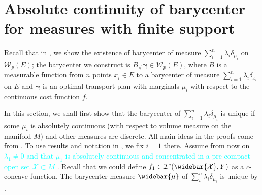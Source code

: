 \section{Absolute continuity of barycenter for measures with finite support}

\label{section:absolute_continuity_finite_support}
Recall that in ,
we show the existence of barycenter of measure $\sum_{i=1}^{n} \lambda_i \delta_{\mu_i}$ on $\mathcal{W}_p(E)$;
the barycenter we construct is $B_{\#}\boldsymbol{\gamma} \in \mathcal{W}_p(E)$,
where $B$ is a measurable function from $n$ points $x_i \in E$ to a barycenter of
measure $\sum_{i=1}^{n} \lambda_i \delta_{x_i}$ on $E$
and $\boldsymbol{\gamma}$ is an optimal transport plan
with marginals $\mu_i$ with respect to the continuous cost function $f$.

In this section, we shall first show that
the barycenter of $\sum_{i=1}^n \lambda_i \delta_{\mu_i}$
is unique if some $\mu_i$
is absolutely continuous (with respect to volume measure on the manifold $M$)
and other measures are discrete.
All main ideas in the proofs come from \cite{KIM2017640}.
To use results and notation in ,
we fix $i = 1$ there.
Assume from now on \textcolor{cyan}{
	$ \lambda_1 \neq 0$ and that $\mu_1$ is absolutely continuous and
	concentrated in a pre-compact open set $ \mathcal{X} \subset M $
}.
Recall that we could define $f_1 \in \mathcal{I}^c( \widebar{ \mathcal{X} }, Y)$
as a $c$-concave function.
The barycenter measure $\widebar{\mu}$ of $\sum_{i}^{n} \lambda_{i} \delta_{\mu_i}$ is unique by .
